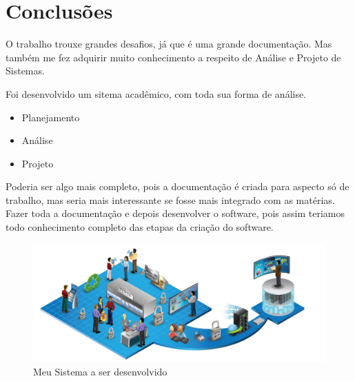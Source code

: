 


\chapter{Conclus\~{o}es}


O trabalho trouxe grandes desafios, já que é uma grande documentação. Mas também me fez adquirir muito conhecimento a respeito
de Análise e Projeto de Sistemas.


Foi desenvolvido um sitema acadêmico, com toda sua forma de análise. 
 \begin{itemize}
  \item Planejamento
  \item Análise
  \item Projeto
 \end{itemize}


Poderia ser algo mais completo, pois a documentação é criada para aspecto só de trabalho, mas seria mais interessante se fosse
mais integrado com as matérias. Fazer toda a documentação e depois desenvolver o software, pois assim teriamos todo conhecimento
completo das etapas da criação do software.



   \begin{figure}[H]
    \begin{center}
        \includegraphics[width=12cm]{MeuSistema.jpg}
        \caption{Meu Sistema a ser desenvolvido} \label{sistema}
    \end{center}
   \end{figure} 